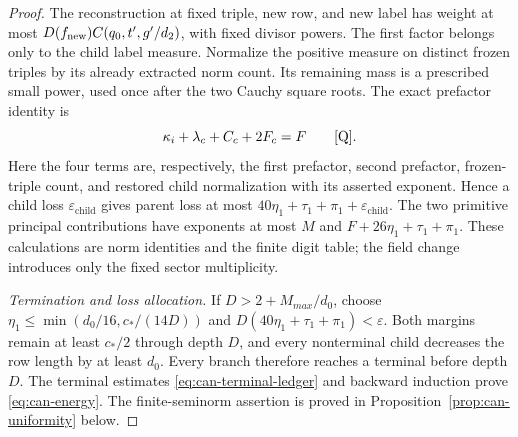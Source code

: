 \documentclass[11pt,a4paper]{article}
\numberwithin{equation}{section}
\theoremstyle{definition}
\theoremstyle{remark}
\newcommand{\eps}{\varepsilon}
\begin{document}
\begin{proof}
The reconstruction at fixed triple, new row, and new label has
weight at most $D(f_{\rm new})C(q_0,t',g'/d_2)$, with fixed divisor
powers.  The first factor belongs only to the child label measure.
Normalize the positive measure on distinct frozen triples by its
already extracted norm count.  Its remaining mass is a prescribed
small power, used once after the two Cauchy square roots.
The exact prefactor identity is
\begin{equation}\label{eq:can-energy-identity}
 \kappa_i+\lambda_c+C_c+2F_c=F
 \qquad\text{\cite[(17.64)]{Q}}.
\end{equation}
Here the four terms are, respectively, the first prefactor, second
prefactor, frozen-triple count, and restored child normalization
with its asserted exponent.  Hence a child loss $\eps_{\mathrm{child}}$
gives parent loss at most
$40\eta_1+\tau_1+\pi_1+\eps_{\mathrm{child}}$.
The two primitive principal contributions have exponents at most
$M$ and $F+26\eta_1+\tau_1+\pi_1$.
These calculations are norm identities and the finite digit table;
the field change introduces only the fixed sector multiplicity.

\smallskip\noindent\emph{Termination and loss allocation.}
If $D>2+M_{max}/d_0$, choose
$\eta_1\le\min(d_0/16,c_*/(14D))$ and
$D(40\eta_1+\tau_1+\pi_1)<\eps$.
Both margins remain at least $c_*/2$ through depth $D$, and every
nonterminal child decreases the row length by at least $d_0$.
Every branch therefore reaches a terminal before depth $D$.  The terminal
estimates \eqref{eq:can-terminal-ledger} and backward induction
prove \eqref{eq:can-energy}.  The finite-seminorm assertion is
proved in Proposition~\ref{prop:can-uniformity} below.
\end{proof}
\end{document}
